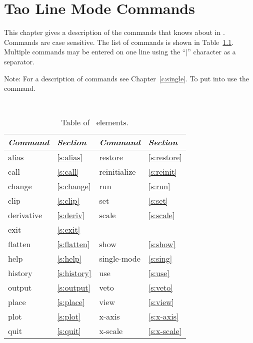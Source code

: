 \chapter{Tao Line Mode Commands}
\label{c:command}

This chapter gives a description of the commands that \tao knows about
in . Commands are case sensitive. The list of commands
is shown in Table~\ref{t:commands}. Multiple commands may be entered
on one line using the ``|'' character as a separator.

Note: For a description of  commands see
Chapter~\ref{c:single}. To put \tao into  use the
 command. 

\begin{table}[h]
\centering
{\tt
\begin{tabular}{|l|l||l|l|} \hline
  {\it Command} & {\it Section}  & {\it Command} & {\it Section} \\ \hline
  alias      & \ref{s:alias}    &  restore      & \ref{s:restore} \\ \hline
  call       & \ref{s:call}     &  reinitialize & \ref{s:reinit}  \\ \hline
  change     & \ref{s:change}   &  run          & \ref{s:run}     \\ \hline
  clip       & \ref{s:clip}     &  set          & \ref{s:set}     \\ \hline
  derivative & \ref{s:deriv}    &  scale        & \ref{s:scale}   \\ \hline
  exit       & \ref{s:exit}     &               &                 \\ \hline
  flatten    & \ref{s:flatten}  &  show         & \ref{s:show}    \\ \hline
  help       & \ref{s:help}     &  single-mode  & \ref{s:sing}    \\ \hline
  history    & \ref{s:history}  &  use          & \ref{s:use}     \\ \hline
  output     & \ref{s:output}   &  veto         & \ref{s:veto}    \\ \hline
  place      & \ref{s:place}    &  view         & \ref{s:view}    \\ \hline
  plot       & \ref{s:plot}     &  x-axis       & \ref{s:x-axis}  \\ \hline
  quit       & \ref{s:quit}     &  x-scale      & \ref{s:x-scale} \\ \hline
\end{tabular}                      
}
\caption{Table of \bmad\ elements.}
\label{t:commands}
\end{table}


